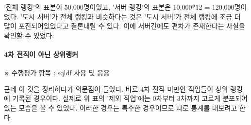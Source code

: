 \documentclass[
]{article}
\begin{document}
'전체 랭킹'의 표본이 50,000명이었고, '서버 랭킹'의 표본은 10,000*12 =
120,000명이었다. '도시 서버'가 전체 랭킹과 비슷하다는 것은 '도시 서버'가
전체 랭킹에 조금 더 많이 포진되어있었다고 결론내릴 수 있다. 이에
서버간에도 편차가 존재한다는 사실을 확인할 수 있었다.

\hypertarget{uxcc28-uxc804uxc9c1uxc774-uxc544uxb2cc-uxc0c1uxc704uxb7aduxcee4}{%
\paragraph{4차 전직이 아닌
상위랭커}\label{uxcc28-uxc804uxc9c1uxc774-uxc544uxb2cc-uxc0c1uxc704uxb7aduxcee4}}

※ 수행평가 항목 : sqldf 사용 및 응용

근데 이 것을 정리하다가 의문점이 들었다. 바로 4차 전직 미만인 직업들이
상위 랭킹에 기록된 경우이다. 실제로 위 표의 '제외 직업'에는 0차부터
3차까지 고르게 분포되어있는 모습을 볼 수 있었다. 이러한 경우는 특수한
경우이므로 따로 통계를 내보려고 한다.
\end{document}
